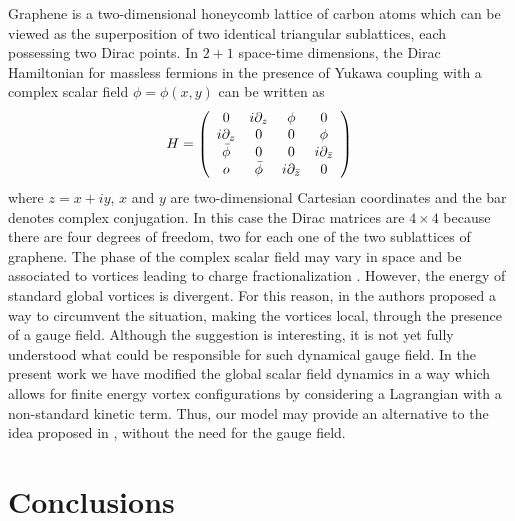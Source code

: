 \documentclass[prd,twocolumn,a4paper,superscriptaddress,floatfix]{revtex4}
\begin{document}
Graphene is a two-dimensional honeycomb lattice of carbon atoms which can be viewed as the superposition of two identical triangular sublattices, each possessing two Dirac points. In $2+1$ space-time dimensions, the Dirac Hamiltonian for massless fermions in the presence of Yukawa coupling with a complex scalar field $\phi=\phi(x,y)$ can be written as
\begin{equation}
H=\left(\begin{array}{c c c c}
0&i\partial_{z}&\phi&0\\
i\partial_{z}&0&0&\phi\\
\bar\phi&0&0&i\partial_{\bar z}\\
o&\bar\phi&i\partial_{\bar z}&0
\end{array}\right)
\end{equation}
where $z=x+iy$, $x$ and $y$ are two-dimensional Cartesian coordinates and the bar denotes complex conjugation. In this case the Dirac matrices are $4\times4$ because there are four degrees of freedom, two for each one of the two sublattices of graphene. The phase of the complex scalar field may vary in space and be associated to vortices leading to charge fractionalization \cite{chamon}. However, the energy of standard global vortices is divergent. For this reason, in \cite{jackiw} the authors proposed a way to circumvent the situation, making the vortices local, through the presence of a gauge field. Although the suggestion is interesting, it is not yet fully understood what could be responsible for such dynamical gauge field. In the present work we have modified the global scalar field dynamics in a way which allows for finite energy vortex configurations by considering a Lagrangian with a non-standard kinetic term. Thus, our model may provide an alternative to the idea proposed in \cite{jackiw}, without the need for the gauge field. 


\section{Conclusions}
\end{document}
